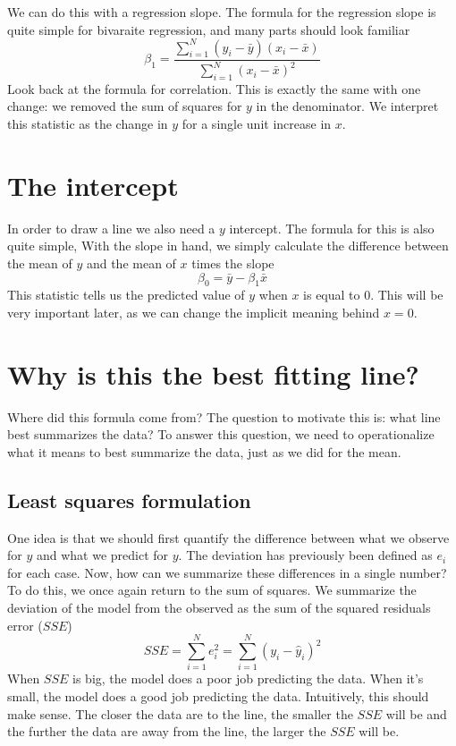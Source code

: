 We can do this with a regression slope. The formula for the regression slope is quite simple for bivaraite regression, and many parts should look familiar
\begin{equation}\label{eq:olsslope}
\beta_1=\frac{\sum_{i=1}^N\left(y_i-\bar{y}\right)\left(x_i-\bar{x}\right)}{\sum_{i=1}^N\left(x_i-\bar{x}\right)^2}
\end{equation}
Look back at the formula for correlation. This is exactly the same with one change: we removed the sum of squares for $y$ in the denominator. We interpret this statistic as the change in $y$ for a single unit increase in $x$.
\section{The intercept}
In order to draw a line we also need a $y$ intercept. The formula for this is also quite simple, With the slope in hand, we simply calculate the difference between the mean of $y$ and the mean of $x$ times the slope
\begin{equation}\label{eq:olsintercept}
\beta_0=\bar{y}-\beta_1\bar{x}
\end{equation}
This statistic tells us the predicted value of $y$ when $x$ is equal to 0. This will be very important later, as we can change the implicit meaning behind $x = 0$.
\section{Why is this the best fitting line?}
Where did this formula come from? The question to motivate this is: what line best summarizes the data? To answer this question, we need to operationalize what it means to best summarize the data, just as we did for the mean.

\subsection{Least squares formulation}

One idea is that we should first quantify the difference between what we observe for $y$ and what we predict for $y$. The deviation has previously been defined as $e_i$ for each case. Now, how can we summarize these differences in a single number? To do this, we once again return to the sum of squares. We summarize the deviation of the model from the observed as the sum of the squared residuals error ($SSE$)
\begin{equation}
SSE=\sum_{i=1}^Ne_i^2=\sum_{i=1}^N\left(y_i-\hat{y}_i\right)^2
\end{equation}
When $SSE$ is big, the model does a poor job predicting the data. When it's small, the model does a good job predicting the data. Intuitively, this should make sense. The closer the data are to the line, the smaller the $SSE$ will be and the further the data are away from the line, the larger the $SSE$ will be.

